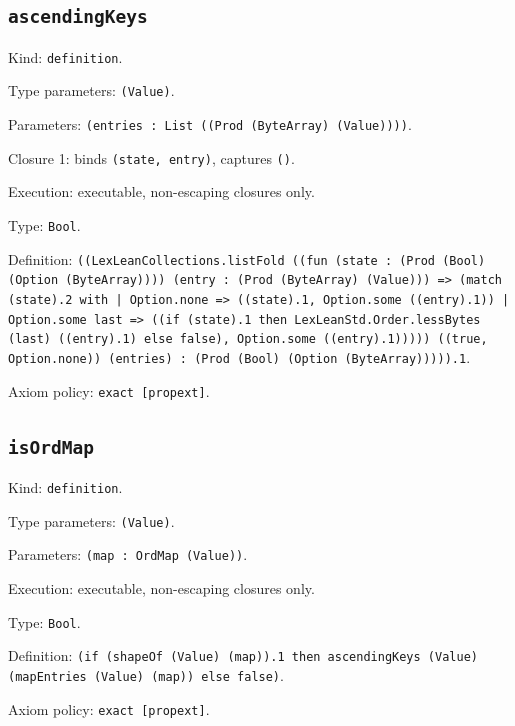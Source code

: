 \documentclass[11pt]{article}
\begin{document}
\subsection*{\texttt{ascendingKeys}}
\noindent Kind: \texttt{definition}.\par
\noindent Type parameters: \texttt{(Value)}.\par
\noindent Parameters: \texttt{(entries : List ((Prod (ByteArray) (Value))))}.\par
\noindent Closure 1: binds \texttt{(state, entry)}, captures \texttt{()}.\par
\noindent Execution: executable, non-escaping closures only.\par
\noindent Type: \texttt{Bool}.\par
\noindent Definition: \texttt{((LexLeanCollections.listFold ((fun (state : (Prod (Bool) (Option (ByteArray)))) (entry : (Prod (ByteArray) (Value))) => (match (state).2 with | Option.none => ((state).1, Option.some ((entry).1)) | Option.some last => ((if (state).1 then LexLeanStd.Order.lessBytes (last) ((entry).1) else false), Option.some ((entry).1))))) ((true, Option.none)) (entries) : (Prod (Bool) (Option (ByteArray))))).1}.\par
\noindent Axiom policy: \texttt{exact [propext]}.\par
\subsection*{\texttt{isOrdMap}}
\noindent Kind: \texttt{definition}.\par
\noindent Type parameters: \texttt{(Value)}.\par
\noindent Parameters: \texttt{(map : OrdMap (Value))}.\par
\noindent Execution: executable, non-escaping closures only.\par
\noindent Type: \texttt{Bool}.\par
\noindent Definition: \texttt{(if (shapeOf (Value) (map)).1 then ascendingKeys (Value) (mapEntries (Value) (map)) else false)}.\par
\noindent Axiom policy: \texttt{exact [propext]}.\par
\end{document}
